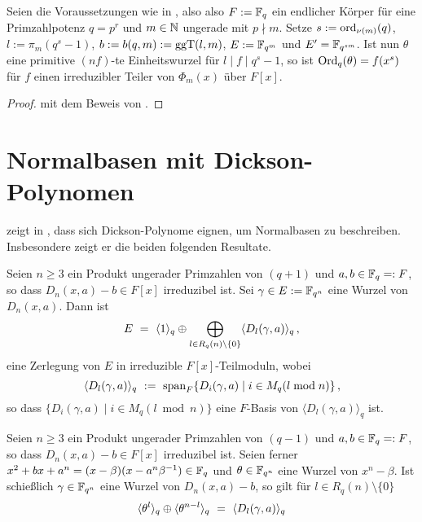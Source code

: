 \begin{lemma}
  \label{lemma:hoehere_wurzeln_auch_erzeuger_reg}
  Seien die Voraussetzungen wie in , also
  also $F := \mathbb{F}_q$ ein endlicher Körper für eine Primzahlpotenz $q = p^r$ 
  und $m\in\mathbb{N}$ ungerade mit $p\nmid m$.
  Setze $s := \operatorname{ord}_{\nu(m)}(q)$, 
  $l := \pi_m(q^s-1)$, $b:= b(q,m) := \operatorname{ggT}(l,m)$, $E := \mathbb{F}_{q^m}$ und
  $E' = \mathbb{F}_{q^{sm}}$. 
  Ist nun $\theta$ eine primitive $(nf)$-te Einheitswurzel für 
  $l \mid f \mid q^s-1$, so ist $\operatorname{Ord}_q(\theta) = f(x^s)$ für 
  $f$ einen irreduzibler Teiler von $\Phi_m(x)$ über $F[x]$.
\end{lemma}
\begin{proof}
   mit dem Beweis von
  .
\end{proof}


\section{Normalbasen mit Dickson-Polynomen}
\citeauthor{scheerhorn:1996} zeigt in
\autocites{scheerhorn:1996}{scheerhorn:1997}, dass sich Dickson-Polynome
eignen, um Normalbasen zu beschreiben. Insbesondere zeigt er die beiden
folgenden Resultate.

\begin{satz}
  \label{satz:scheerhorn1}
  Seien $n\geq 3$ ein Produkt ungerader Primzahlen von $(q+1)$ und 
  $a,b\in \mathbb{F}_q =: F$, so dass $D_n(x,a)-b \in F[x]$ irreduzibel ist.
  Sei $\gamma \in E := \mathbb{F}_{q^n}$ eine Wurzel von $D_n(x,a)$. Dann ist
  \[ E \ =\  \langle 1\rangle_q \oplus 
    \bigoplus_{l\in R_q(n)\setminus \{0\}} \langle D_l(\gamma,a)\rangle_q\,,\]
  eine Zerlegung von $E$ in irreduzible $F[x]$-Teilmoduln, wobei
  \[ \langle D_l(\gamma,a)\rangle_q \ :=\ 
    \operatorname{span}_F\{ D_i(\gamma,a) \mid i\in M_q(l\bmod n)\} \,,\]
  so dass $\{ D_i(\gamma,a) \mid i\in M_q(l\bmod n)\}$ eine $F$-Basis von
  $\langle D_l(\gamma,a)\rangle_q$ ist.
\end{satz}

\begin{satz} 
  \label{satz:scheerhorn2}
  Seien $n\geq 3$ ein Produkt ungerader Primzahlen von $(q-1)$ und
  $a,b \in \mathbb{F}_q =: F$, so dass $D_n(x,a)-b\in F[x]$ irreduzibel ist.
  Seien ferner $x^2+bx +a^n = (x-\beta)(x-a^n\beta^{-1}) \in \mathbb{F}_q$ und
  $\theta \in \mathbb{F}_{q^n}$ eine Wurzel von $x^n-\beta$. Ist schießlich
  $\gamma\in \mathbb{F}_{q^n}$ eine Wurzel von $D_n(x,a) -b$, so gilt für
  $l\in R_q(n) \setminus\{0\}$
  \[ \langle \theta^l\rangle_q \oplus \langle \theta^{n-l}\rangle_q
  \ =\  \langle D_l(\gamma,a)\rangle_q\]
\end{satz}

